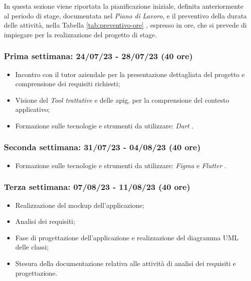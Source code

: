 In questa sezione viene riportata la pianificazione iniziale, definita anteriormente al periodo di stage, documentata nel \emph{Piano di Lavoro}, e il preventivo della durata delle attività, nella Tabella \ref{tab:preventivo-ore} , espresso in ore, che si prevede di impiegare per la realizzazione del progetto di stage. \\

\subsubsection{Prima settimana: 24/07/23 - 28/07/23 (40 ore)}
    \begin{itemize}
        \item Incontro con il tutor aziendale per la presentazione dettagliata del progetto e comprensione dei requisiti richiesti;
        \item Visione del \emph{Tool trattative} e delle \gls{apig}\glsoccur, per la comprensione del contesto applicativo;
        \item Formazione sulle tecnologie e strumenti da utilizzare: \emph{Dart} \cite{site:dart}.
    \end{itemize}
\subsubsection{Seconda settimana: 31/07/23 - 04/08/23 (40 ore)}
    \begin{itemize}
        \item Formazione sulle tecnologie e strumenti da utilizzare: \emph{Figma} \cite{site:figma} e \emph{Flutter} \cite{site:flutter}.
    \end{itemize}
\subsubsection{Terza settimana: 07/08/23 - 11/08/23 (40 ore)}
    \begin{itemize}
        \item Realizzazione del \gls{mockup} dell'applicazione;
        \item Analisi dei requisiti;
        \item Fase di progettazione dell'applicazione e realizzazione del diagramma UML delle classi;
        \item Stesura della documentazione relativa alle attività di analisi dei requisiti e progettazione.
    \end{itemize}
